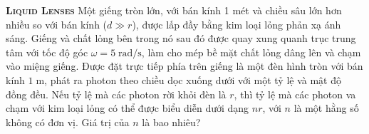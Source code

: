 \begin{problem}
{\textbf{\textsc{Liquid Lenses}}} Một giếng tròn lớn, với bán kính 1 mét và chiều sâu lớn hơn nhiều so với bán kính ($d \gg r$), được lấp đầy bằng kim loại lỏng phản xạ ánh sáng. Giếng và chất lỏng bên trong nó sau đó được quay xung quanh trục trung tâm với tốc độ góc $\omega = 5\;\mathrm{rad/s}$, làm cho mép bề mặt chất lỏng dâng lên và chạm vào miệng giếng. Được đặt trực tiếp phía trên giếng là một đèn hình tròn với bán kính $1\;\mathrm{m}$, phát ra photon theo chiều dọc xuống dưới với một tỷ lệ và mật độ đồng đều. Nếu tỷ lệ mà các photon rời khỏi đèn là $r$, thì tỷ lệ mà các photon va chạm với kim loại lỏng có thể được biểu diễn dưới dạng $nr$, với $n$ là một hằng số không có đơn vị. Giá trị của $n$ là bao nhiêu?

\end{problem}